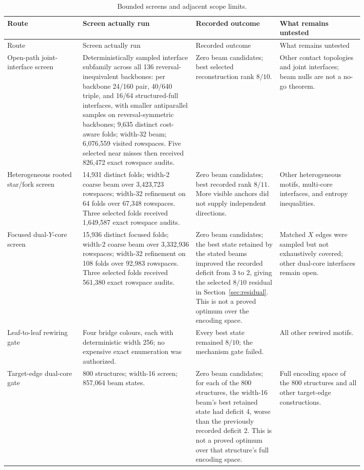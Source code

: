 \documentclass[11pt]{article}
\begin{document}
\begin{longtable}{p{0.18\linewidth}p{0.27\linewidth}p{0.20\linewidth}p{0.20\linewidth}}
\caption{Bounded screens and adjacent scope limits.}\label{tab:screens}\\
\toprule
Route & Screen actually run & Recorded outcome & What remains untested \\
\midrule
\endfirsthead
\toprule
Route & Screen actually run & Recorded outcome & What remains untested \\
\midrule
\endhead
Open-path joint-interface screen & Deterministically sampled interface subfamily across all 136 reversal-inequivalent backbones: per backbone 24/160 pair, 40/640 triple, and 16/64 structured-full interfaces, with smaller antiparallel samples on reversal-symmetric backbones; 9,635 distinct cost-aware folds; width-32 beam; 6,076,559 visited rowspaces. Five selected near misses then received 826,472 exact rowspace audits. & Zero beam candidates; best selected reconstruction rank $8/10$. & Other contact topologies and joint interfaces; beam nulls are not a no-go theorem. \\
\addlinespace
Heterogeneous rooted star/fork screen & 14,931 distinct folds; width-2 coarse beam over 3,423,723 rowspaces; width-32 refinement on 64 folds over 67,348 rowspaces. Three selected folds received 1,649,587 exact rowspace audits. & Zero beam candidates; best recorded rank $8/11$. More visible anchors did not supply independent directions. & Other heterogeneous motifs, multi-core interfaces, and entropy inequalities. \\
\addlinespace
Focused dual-$Y$-core screen & 15,936 distinct focused folds; width-2 coarse beam over 3,332,936 rowspaces; width-32 refinement on 108 folds over 92,983 rowspaces. Three selected folds received 561,380 exact rowspace audits. & Zero beam candidates; the best state retained by the stated beams improved the recorded deficit from 3 to 2, giving the selected $8/10$ residual in Section~\ref{sec:residual}. This is not a proved optimum over the encoding space. & Matched $X$ edges were sampled but not exhaustively covered; other dual-core interfaces remain open. \\
\addlinespace
Leaf-to-leaf rewiring gate & Four bridge colours, each with deterministic width 256; no expensive exact enumeration was authorized. & Every best state remained $8/10$; the mechanism gate failed. & All other rewired motifs. \\
\addlinespace
Target-edge dual-core gate & 800 structures; width-16 screen; 857,064 beam states. & Zero beam candidates; for each of the 800 structures, the width-16 beam's best retained state had deficit 4, worse than the previously recorded deficit 2. This is not a proved optimum over that structure's full encoding space. & Full encoding space of the 800 structures and all other target-edge constructions. \\
\bottomrule
\end{longtable}
\end{document}
